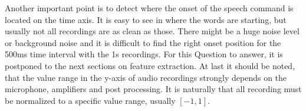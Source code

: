 Another important point is to detect where the onset of the speech command is located on the time axis. It is easy to see in  where the words are starting, but usually not all recordings are as clean as those.
There might be a huge noise level or background noise and it is difficult to find the right onset position for the 500ms time interval with the 1s recordings.
For this Question to answer, it is postponed to the next sections on feature extraction.
At last it should be noted, that the value range in the y-axis of audio recordings strongly depends on the microphone, amplifiers and post processing.
It is naturally that all recording must be normalized to a specific value range, usually $[-1, 1]$.